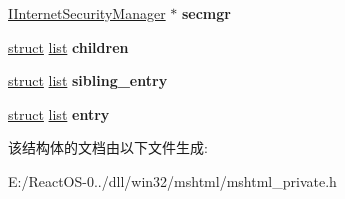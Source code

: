 \begin{DoxyCompactItemize}
\hyperlink{interface_i_internet_security_manager}{I\+Internet\+Security\+Manager} $\ast$ {\bfseries secmgr}
\item 
\mbox{\label{struct_h_t_m_l_outer_window_a07cc22f5e6cb3fa676ce902e4476bafa}} 
\hyperlink{interfacestruct}{struct} \hyperlink{classlist}{list} {\bfseries children}
\item 
\mbox{\label{struct_h_t_m_l_outer_window_a59b33fb9c9067bde002b166c95c96fdf}} 
\hyperlink{interfacestruct}{struct} \hyperlink{classlist}{list} {\bfseries sibling\+\_\+entry}
\item 
\mbox{\label{struct_h_t_m_l_outer_window_a70371542a670ea9e8254e92817cde702}} 
\hyperlink{interfacestruct}{struct} \hyperlink{classlist}{list} {\bfseries entry}
\end{DoxyCompactItemize}


该结构体的文档由以下文件生成\+:\begin{DoxyCompactItemize}
\item 
E\+:/\+React\+O\+S-\/0../dll/win32/mshtml/mshtml\+\_\+private.\+h\end{DoxyCompactItemize}
